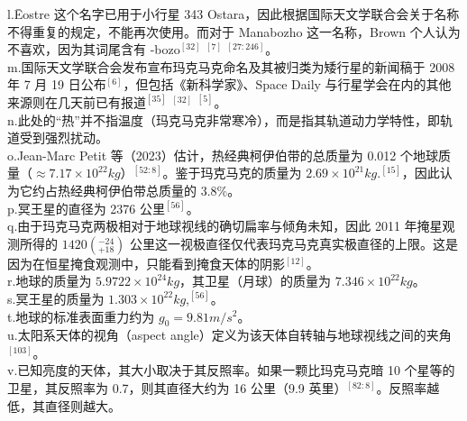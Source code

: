 l.Ēostre 这个名字已用于小行星 343 Ostara，因此根据国际天文学联合会关于名称不得重复的规定，不能再次使用。而对于 Manabozho 这一名称，Brown 个人认为不喜欢，因为其词尾含有 -bozo$^{[32]}$ $^{[7]}$ $^{[27:246]}$。\\
m.国际天文学联合会发布宣布玛克马克命名及其被归类为矮行星的新闻稿于 2008 年 7 月 19 日公布$^{[6]}$，但包括《新科学家》、Space Daily 与行星学会在内的其他来源则在几天前已有报道$^{[35]}$ $^{[32]}$ $^{[5]}$。\\
n.此处的“热”并不指温度（玛克马克非常寒冷），而是指其轨道动力学特性，即轨道受到强烈扰动。\\
o.Jean-Marc Petit 等（2023）估计，热经典柯伊伯带的总质量为 0.012 个地球质量（$\approx7.17\times10^{22}kg$）$^{[52:8]}$。鉴于玛克马克的质量为 $2.69\times 10^{21}kg$.$^{[15]}$，因此认为它约占热经典柯伊伯带总质量的 3.8\%。\\
p.冥王星的直径为 2376 公里$^{[56]}$。\\
q.由于玛克马克两极相对于地球视线的确切扁率与倾角未知，因此 2011 年掩星观测所得的 $1420(_{+18}^{-24})$ 公里这一视极直径仅代表玛克马克真实极直径的上限。这是因为在恒星掩食观测中，只能看到掩食天体的阴影$^{[12]}$。\\
r.地球的质量为 $5.9722\times10^{24}kg$，其卫星（月球）的质量为 $7.346\times10^{22}kg$。\\
s.冥王星的质量为 $1.303\times10^{22}kg$,$^{[56]}$。\\
t.地球的标准表面重力约为 $g_0 = 9.81m/s^2$。\\
u.太阳系天体的视角（aspect angle）定义为该天体自转轴与地球视线之间的夹角$^{[103]}$。\\
v.已知亮度的天体，其大小取决于其反照率。如果一颗比玛克马克暗 10 个星等的卫星，其反照率为 0.7，则其直径大约为 16 公里（9.9 英里）$^{[82:8]}$。反照率越低，其直径则越大。
